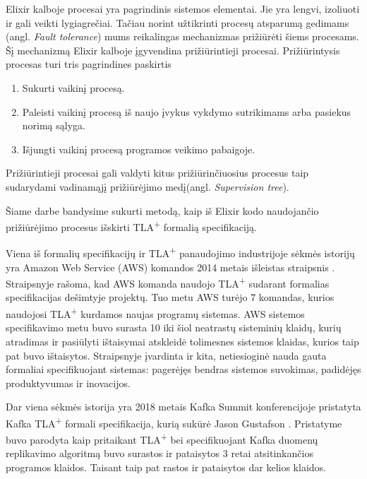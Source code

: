 \documentclass{VUMIFPSmagistrinis}
\begin{document}
        Elixir kalboje procesai yra pagrindinis sistemos elementai.
        Jie yra lengvi, izoliuoti ir gali veikti lygiagrečiai.
        Tačiau norint užtikrinti procesų atsparumą gedimams (angl. {\it Fault tolerance}) mums reikalingas mechanizmas prižiūrėti šiems procesams.
        Šį mechanizmą Elixir kalboje įgyvendina prižiūrintieji procesai.
        Prižiūrintysis procesas turi tris pagrindines paskirtis
        \begin{enumerate}
            \item {Sukurti vaikinį procesą.}
            \item {Paleisti vaikinį procesą iš naujo įvykus vykdymo sutrikimams arba pasiekus norimą sąlyga.}
            \item {Išjungti vaikinį procesą programos veikimo pabaigoje.}
        \end{enumerate}

        Prižiūrintieji procesai gali valdyti kitus prižiūrinčiuosius procesus taip sudarydami vadinamąjį
        prižiūrėjimo medį(angl. {\it Supervision tree}).

        Šiame darbe bandysime sukurti metodą, kaip iš Elixir kodo naudojančio prižiūrėjimo procesus išskirti TLA\textsuperscript{+} formalią specifikaciją.


		Viena iš formalių specifikacijų ir TLA\textsuperscript{+} panaudojimo industrijoje sėkmės istorijų yra Amazon Web Service (AWS) komandos 2014 metais išleistas straipsnis \cite{newcombe2014use}.
		Straipsnyje rašoma,  kad AWS komanda naudojo TLA\textsuperscript{+} sudarant formalias specifikacijas dešimtyje projektų. Tuo metu AWS turėjo 7 komandas, kurios naudojosi TLA\textsuperscript{+} kurdamos naujas programų sistemas.
		AWS sistemos specifikavimo metu buvo surasta 10 iki šiol neatrastų sisteminių klaidų, kurių atradimas ir pasiūlyti ištaisymai atskleidė tolimesnes sistemos klaidas, kurios taip pat buvo ištaisytos.
		Straipsnyje įvardinta ir kita, netiesioginė nauda gauta formaliai specifikuojant sistemas: pagerėjęs bendras sistemos suvokimas, padidėjęs produktyvumas ir inovacijos.
		

		Dar viena sėkmės istorija yra 2018 metais Kafka Summit konferencijoje pristatyta Kafka TLA\textsuperscript{+} formali specifikacija, kurią sukūrė Jason Gustafson \cite{kfkTla}.
		Pristatyme buvo parodyta kaip pritaikant TLA\textsuperscript{+} bei specifikuojant Kafka duomenų replikavimo algoritmą buvo surastos ir pataisytos 3 retai atsitinkančios programos klaidos.
		Taisant taip pat rastos ir pataisytos dar kelios klaidos.
\end{document}
